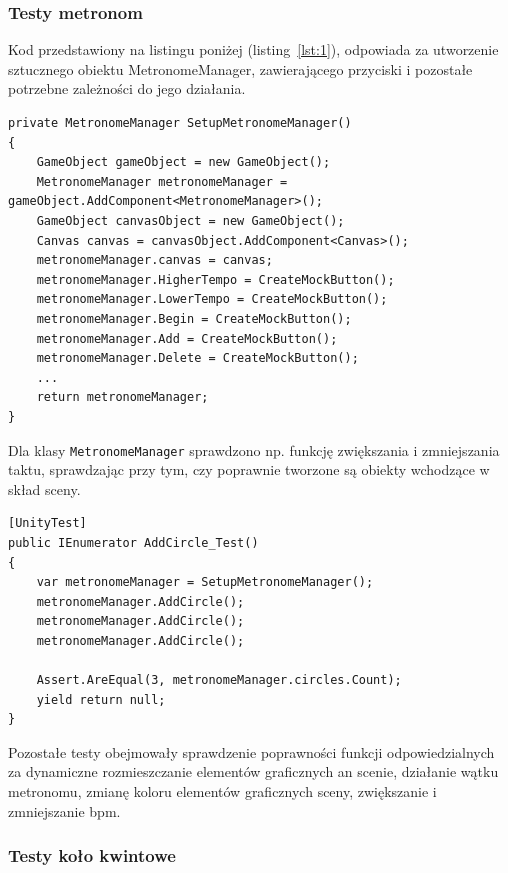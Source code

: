 \subsubsection{Testy metronom}

Kod przedstawiony na listingu poniżej (listing~\ref{lst:1}), odpowiada za utworzenie sztucznego obiektu MetronomeManager, zawierającego przyciski i pozostałe potrzebne zależności do jego działania. 

\begin{lstlisting}[style=sharpcstyle,caption=Funkcja \texttt{SetupMetronomeManager}, label=lst:1]
private MetronomeManager SetupMetronomeManager()
{
    GameObject gameObject = new GameObject();
    MetronomeManager metronomeManager = gameObject.AddComponent<MetronomeManager>();
    GameObject canvasObject = new GameObject();
    Canvas canvas = canvasObject.AddComponent<Canvas>();
    metronomeManager.canvas = canvas;
    metronomeManager.HigherTempo = CreateMockButton();
    metronomeManager.LowerTempo = CreateMockButton();
    metronomeManager.Begin = CreateMockButton();
    metronomeManager.Add = CreateMockButton();
    metronomeManager.Delete = CreateMockButton();
    ...
    return metronomeManager;
}
\end{lstlisting}

Dla klasy \texttt{MetronomeManager} sprawdzono np. funkcję zwiększania i zmniejszania taktu, sprawdzając przy tym, czy poprawnie tworzone są obiekty wchodzące w skład sceny.

\begin{lstlisting}[style=sharpcstyle,caption=Funkcja \texttt{AddCircle\_Test}, label=lst:2]
[UnityTest]
public IEnumerator AddCircle_Test()
{
    var metronomeManager = SetupMetronomeManager();    
    metronomeManager.AddCircle();
    metronomeManager.AddCircle();
    metronomeManager.AddCircle();
    
    Assert.AreEqual(3, metronomeManager.circles.Count);
    yield return null;
}
\end{lstlisting}

Pozostałe testy obejmowały sprawdzenie poprawności funkcji odpowiedzialnych za dynamiczne rozmieszczanie elementów graficznych an scenie, działanie wątku metronomu, zmianę koloru elementów graficznych sceny, zwiększanie i zmniejszanie bpm.

\subsubsection{Testy koło kwintowe}

